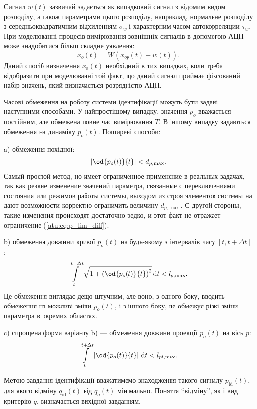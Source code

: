 Сигнал
$ w (t) $ зазвичай задається як випадковий сигнал з відомим видом
розподілу, а також параметрами цього розподілу, наприклад,
нормальне розподілу з середньоквадратичним відхиленням
$ \sigma_w $ і характерним часом автокорреляции
$ \tau_w $. При моделюванні процесів вимірювання зовнішніх сигналів
в допомогою АЦП може знадобитися більш складне уявлення:
%
\[
  x_o(t) = W( x_{op}(t) + w(t) ).
\]
%
Даний спосіб визначення
$ x_o (t) $ необхідний в тих випадках, коли треба відобразити при
моделюванні той факт, що даний сигнал приймає фіксований набір
значень, який визначається розрядністю АЦП.

Часові обмеження на роботу системи ідентифікації можуть бути
задані наступними способами. У найпростішому випадку, значення
$ p_o $ вважається постійним, але обмежена повне час вимірювання
$ T $. В іншому випадку задаються обмеження на динаміку
$ p_o (t) $. Поширені способи:

a) обмеження похідної:
%
\begin{equation}
  \left| \od{p_o(t)}{t} \right| < d_{p,\max}.
  \label{atu:eq:p_lim_diff}
\end{equation}
Самый простой метод, но имеет ограниченное применение в реальных
задачах, так как резкие изменение значений параметра,
связанные с переключениями состояния или режимов работы системы,
выходом из строя элементов системы на дают возможности корректно ограничить
величину  $d_{p,\max}$. С другой стороны, такие изменения
происходят достаточно редко, и этот факт не отражает ограничение (\ref{atu:eq:p_lim_diff}).

b) обмеження довжини кривої
$ p_o (t) $ на будь-якому з інтервалів часу
$ [t, t + \Delta t] $:
\begin{equation}
  \int\limits_{t}^{t+\Delta t} \sqrt{1 + \left( \od{p_o(t)}{t} \right)^2 } \, \mathrm{d}t < l_{p,\max}.
  \label{atu:eq:p_lim_l}
\end{equation}
%
Це обмеження виглядає дещо штучним, але воно, з одного боку,
вводить обмеження на можливі зміни
$ p_o (t) $, і з іншого боку, не обмежує різкі зміни параметра в
окремих областях.

c) спрощена форма варіанту b) --- обмеження довжини проекції
$ p_o (t) $ на вісь
$ p $:
\begin{equation}
  \int\limits_{t}^{t+\Delta t} \left| \od{p_o(t)}{t} \right | \, \mathrm{d}t < l_{pl,\max}.
  \label{atu:eq:p_lim_pl}
\end{equation}

Метою завдання ідентифікації вважатимемо знаходження такого
сигналу
$ p_\mathrm{id} (t) $, для якого відміну
$ q_\mathrm{id} (t) $ від
$ q_o (t) $ мінімально. Поняття ``відміну'', як і вид критерію
$ q $, визначається вихідної завданням.

